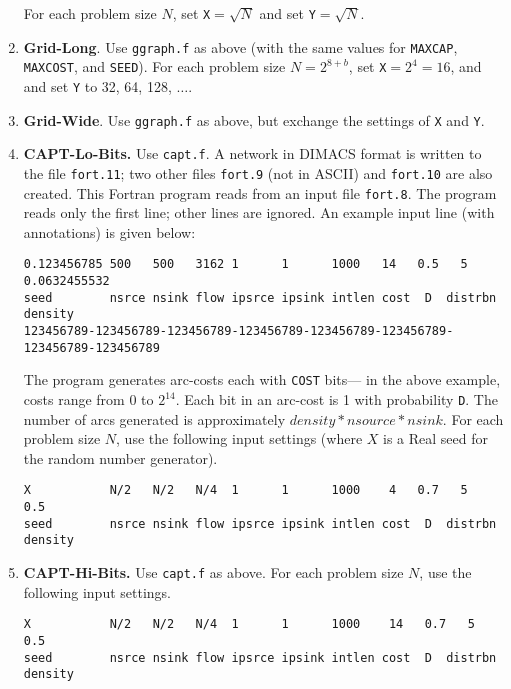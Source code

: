 \begin{enumerate}
For each problem size $N$, set {\tt X}$ = \sqrt{N}$ and 
set {\tt Y}$ = \sqrt{N}$.    

\item {\bf Grid-Long}.  Use {\tt ggraph.f} as above (with the 
same values for {\tt MAXCAP}, {\tt MAXCOST}, and
{\tt SEED}).   For each problem size $N = 2^{8 + b}$, 
set {\tt X}$= 2^4 = 16$, and and set {\tt Y} to 32, 64, 128, $\ldots$.  

\item {\bf Grid-Wide}.  Use {\tt ggraph.f} as above, but exchange 
the settings of {\tt X} and {\tt Y}. 

\item {\bf CAPT-Lo-Bits.}  Use {\tt capt.f}.   
A network in DIMACS format is written to the file {\tt fort.11};
two other files {\tt fort.9} (not in ASCII) and {\tt fort.10} are 
also created.  This Fortran program reads from an input file {\tt fort.8}.
The program reads only the first line; other lines are ignored.  
An example input line (with annotations) is given below:
\begin{verbatim} 
0.123456785 500   500   3162 1      1      1000   14   0.5   5     0.0632455532
seed        nsrce nsink flow ipsrce ipsink intlen cost  D  distrbn density
123456789-123456789-123456789-123456789-123456789-123456789-123456789-123456789
\end{verbatim} 

The program generates arc-costs each with {\tt COST} bits---
in the above example, costs range from 0 to $2^{14}$.  Each bit in 
an arc-cost is 1 with probability {\tt D}.  
The number of arcs generated is approximately $density * nsource * nsink$.  
For each problem size $N$, use the following input 
settings (where $X$ is a Real seed for the random number generator).

\begin{verbatim} 
X           N/2   N/2   N/4  1      1      1000    4   0.7   5     0.5
seed        nsrce nsink flow ipsrce ipsink intlen cost  D  distrbn density
\end{verbatim}

\item {\bf CAPT-Hi-Bits.} Use {\tt capt.f} as above.  For each problem size
$N$, use the following input settings.
\begin{verbatim} 
X           N/2   N/2   N/4  1      1      1000    14   0.7   5     0.5
seed        nsrce nsink flow ipsrce ipsink intlen cost  D  distrbn density
\end{verbatim}


\end{enumerate}
